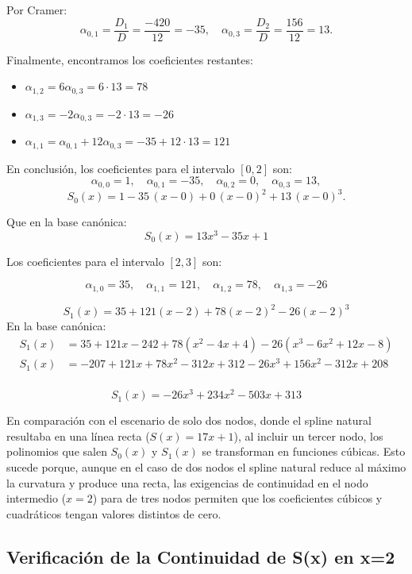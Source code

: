 \documentclass{article}
\begin{document}
Por Cramer:
$$
\alpha_{0,1} = \frac{D_{1}}{D} = \frac{-420}{12} = -35,
\quad
\alpha_{0,3} = \frac{D_{2}}{D} = \frac{156}{12} = 13.
$$

Finalmente, encontramos los coeficientes restantes:
\begin{itemize}
    \item \(\alpha_{1,2} = 6\alpha_{0,3} = 6\cdot13 = 78\)
    \item \(\alpha_{1,3} = -2\alpha_{0,3} = -2\cdot13 = -26\)
    \item \(\alpha_{1,1} = \alpha_{0,1} + 12\alpha_{0,3} = -35 + 12\cdot13 = 121\)
\end{itemize}

En conclusión, los coeficientes para el intervalo \([0,2]\) son:
$$
\alpha_{0,0} = 1,\quad \alpha_{0,1} = -35,\quad \alpha_{0,2} = 0,\quad \alpha_{0,3} = 13,
$$
$$
S_{0}(x) = 1 - 35\,(x-0) + 0\,(x-0)^{2} + 13\,(x-0)^{3}.
$$

Que en la base canónica:
$$ \boxed{S_0(x) = 13x^3 - 35x + 1} $$

Los coeficientes para el intervalo $[2, 3]$ son:


$$\alpha_{1,0} = 35, \quad \alpha_{1,1} = 121, \quad \alpha_{1,2} = 78, \quad \alpha_{1,3} = -26$$

$$ S_1(x) = 35 + 121(x-2) + 78(x-2)^2 - 26(x-2)^3 $$
En la base canónica:
\begin{align*}
    S_1(x) &= 35 + 121x - 242 + 78(x^2 - 4x + 4) - 26(x^3 - 6x^2 + 12x - 8) \\
    S_1(x) &= -207 + 121x + 78x^2 - 312x + 312 - 26x^3 + 156x^2 - 312x + 208 \\
\end{align*}

$$\boxed{S_1(x) = -26x^3 + 234x^2 - 503x + 313}$$


En comparación con el escenario de solo dos nodos, donde el spline natural resultaba en una línea recta (\(S(x) = 17x + 1\)), al incluir un tercer nodo, los polinomios que salen \(S_0(x)\) y \(S_1(x)\) se transforman en funciones cúbicas. Esto sucede porque, aunque en el caso de dos nodos el spline natural reduce al máximo la curvatura y produce una recta, las exigencias de continuidad en el nodo intermedio (\(x=2\)) para de tres nodos permiten que los coeficientes cúbicos y cuadráticos tengan valores distintos de cero.


\subsection{Verificación de la Continuidad de S(x) en x=2}
\end{document}
